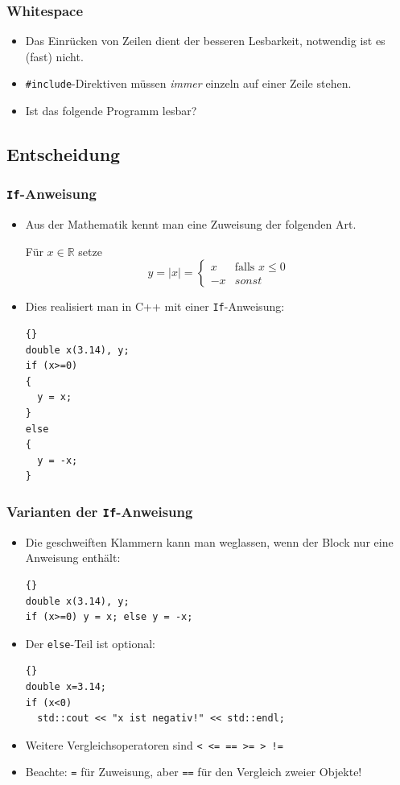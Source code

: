 \begin{frame}[fragile]
\frametitle{Whitespace}
\begin{itemize}
\item Das Einrücken von Zeilen dient der besseren Lesbarkeit,
  notwendig ist es (fast) nicht.
\item \lstinline{#include}-Direktiven müssen \textsl{immer} einzeln
  auf einer Zeile stehen.
\item Ist das folgende Programm lesbar?

\end{itemize}
\end{frame}

\subsection{Entscheidung}

\begin{frame}[fragile]
\frametitle{\lstinline{If}-Anweisung}
\begin{itemize}
\item Aus der Mathematik kennt man eine \glqq{}Zuweisung\grqq{} der
  folgenden Art.

Für $x\in\mathbb{R}$ setze
\begin{equation*}
y = |x| = \left\{\begin{array}{ll}
x & \text{falls $x\leq 0$}\\
-x & sonst
\end{array}\right.
\end{equation*}
\item Dies realisiert man in C++ mit einer \lstinline{If}-Anweisung:
{\scriptsize\begin{lstlisting}{}
double x(3.14), y;
if (x>=0)
{
  y = x;
}
else
{
  y = -x;
}
\end{lstlisting}}
\end{itemize}
\end{frame}

\begin{frame}[fragile]
\frametitle{Varianten der \lstinline{If}-Anweisung}
\begin{itemize}
\item Die geschweiften Klammern kann man weglassen, wenn der Block nur
  eine Anweisung enthält:
{\scriptsize\begin{lstlisting}{}
double x(3.14), y;
if (x>=0) y = x; else y = -x;
\end{lstlisting}}
\item Der \lstinline{else}-Teil ist optional:
{\scriptsize\begin{lstlisting}{}
double x=3.14;
if (x<0)
  std::cout << "x ist negativ!" << std::endl;
\end{lstlisting}}
\item Weitere Vergleichsoperatoren sind \lstinline{< <= == >= > !=}\\
\item Beachte: \lstinline{=} für Zuweisung, aber \lstinline{==} für den
Vergleich zweier Objekte!
\end{itemize}
\end{frame}


